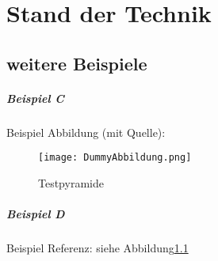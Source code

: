 \chapter{Stand der Technik}

\section{weitere Beispiele}

\paragraph{Beispiel C}
Beispiel Abbildung (mit Quelle):
\begin{figure}[htbp]
    \centering
      \texttt{[image: DummyAbbildung.png]}
    \caption[Testpyramide]{Testpyramide \citep{Zeiss2024}}\label{fig:Testarten}
\end{figure}

\paragraph{Beispiel D}
Beispiel Referenz: siehe Abbildung\ref{fig:Testarten}